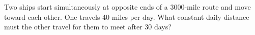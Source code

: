 Two ships start simultaneously at opposite ends of a 3000-mile route and move toward each other. One travels 40 miles per day. What constant daily distance must the other travel for them to meet after 30 days?
